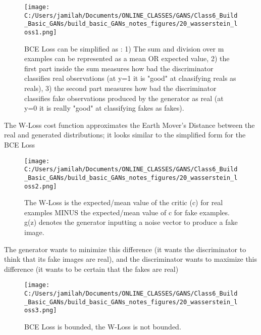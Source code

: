 \documentclass[11pt, onecolumn]{article}
\begin{document}
\begin{figure}[htp]
\begin{center}
\texttt{[image: C:/Users/jamilah/Documents/ONLINE\_CLASSES/GANS/Class6\_Build\_Basic\_GANs/build\_basic\_GANs\_notes\_figures/20\_wasserstein\_loss1.png]}
\end{center}
\caption{BCE Loss can be simplified as : 1) The sum and division over m examples can be represented as a mean OR expected value, 2) the first part inside the sum measures how bad the discriminator classifies real observations (at y=1 it is "good" at claasifying reals as reals), 3) the second part measures how bad the discriminator classifies fake observations produced by the generator as real (at y=0 it is really "good" at classifying fakes as fakes).}
\label{20_wasserstein_loss1}
\end{figure}

The W-Loss cost function approximates the Earth Mover's Distance between the real and generated distributions; it looks similar to the simplified form for the BCE Loss

\begin{figure}[htp]
\begin{center}
\texttt{[image: C:/Users/jamilah/Documents/ONLINE\_CLASSES/GANS/Class6\_Build\_Basic\_GANs/build\_basic\_GANs\_notes\_figures/20\_wasserstein\_loss2.png]}
\end{center}
\caption{The W-Loss is the expected/mean value of the critic (c) for real examples MINUS the expected/mean value of c for fake examples.  g(z) denotes the generator inputting a noise vector to produce a fake image.}
\label{20_wasserstein_loss2}
\end{figure}

The generator wants to minimize this difference (it wants the discriminator to think that its fake images are real), and the discriminator wants to maximize this difference (it wants to be certain that the fakes are real)

\begin{figure}[htp]
\begin{center}
\texttt{[image: C:/Users/jamilah/Documents/ONLINE\_CLASSES/GANS/Class6\_Build\_Basic\_GANs/build\_basic\_GANs\_notes\_figures/20\_wasserstein\_loss3.png]}
\end{center}
\caption{BCE Loss is bounded, the W-Loss is not bounded.}
\label{20_wasserstein_loss3}
\end{figure}
\end{document}
